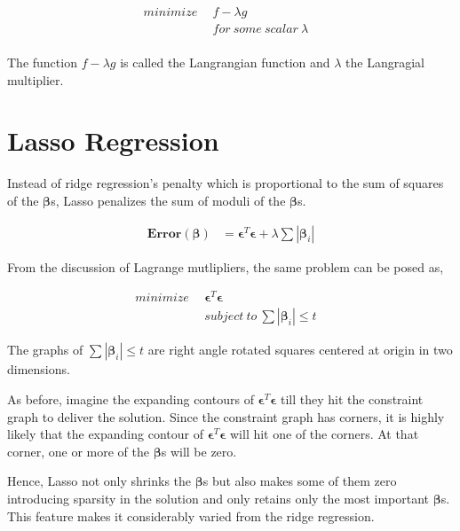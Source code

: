 \documentclass[11pt, a4paper]{article}
\begin{document}
\begin{align*}
	minimize\ \ &f - \lambda g &                            \\
	            & for\ some\ scalar\ \lambda \\
\end{align*}

The function $f - \lambda g$ is called the Langrangian function and $\lambda$ the Langragial multiplier.

\section{Lasso Regression}

Instead of ridge regression's penalty which is proportional to the sum of squares of the $\boldsymbol\beta$s, Lasso penalizes the sum of moduli of the $\boldsymbol\beta$s. 

\begin{align*}
	\mathbf{Error}(\boldsymbol{\beta}) & = \boldsymbol{\epsilon}^T\boldsymbol{\epsilon} + \lambda \sum |\boldsymbol\beta_i| 
\end{align*}

From the discussion of Lagrange mutlipliers, the same problem can be posed as, 

\begin{align*}
	minimize\ \ &\boldsymbol{\epsilon}^T\boldsymbol{\epsilon} &                                               \\
	            & subject\ to\ \sum |\boldsymbol\beta_i| \leq t 
\end{align*}

The graphs of $\sum |\boldsymbol\beta_i| \leq t$ are right angle rotated squares centered at origin in two dimensions. 

As before, imagine the expanding contours of $\boldsymbol{\epsilon}^T\boldsymbol{\epsilon}$ till they hit the constraint graph to deliver the solution. Since the constraint graph has corners, it is highly likely that the expanding contour of $\boldsymbol{\epsilon}^T\boldsymbol{\epsilon}$ will hit one of the corners. At that corner, one or more of the $\boldsymbol\beta$s will be zero.

Hence, Lasso not only shrinks the $\boldsymbol\beta$s but also makes some of them zero introducing sparsity in the solution and only retains only the most important $\boldsymbol\beta$s. This feature makes it considerably varied from the ridge regression.     
\end{document}
